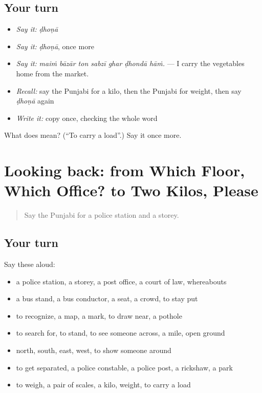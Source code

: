 \subsection*{Your turn}
\begin{itemize}
\raggedright
  \item \emph{Say it:} \emph{ḍhoṇā}
  \item \emph{Say it:} \emph{ḍhoṇā}, once more
  \item \emph{Say it:} \emph{maiṁ bāzār ton sabzī ghar ḍhondā hāṁ.} — I carry the vegetables home from the market.
  \item \emph{Recall:} say the Punjabi for a kilo, then the Punjabi for weight, then say \emph{ḍhoṇā} again
  \item \emph{Write it:} copy \textbf{} once, checking the whole word
\end{itemize}

\begin{tcolorbox}[breakable,colback=teal!4,colframe=teal!35!black,title={Before you move on}]
What does  mean? (\textquotedblleft{}To carry a load\textquotedblright{}.) Say it once more.
\end{tcolorbox}
\section[(dialogue)]{Looking back: from Which Floor, Which Office? to Two Kilos, Please}

\label{lesson:PA-R273-review-267-273}



\begin{quote}
Say the Punjabi for a police station and a storey.
\end{quote}

\subsection*{Your turn}
Say these aloud:

\begin{itemize}
\raggedright
  \item a police station, a storey, a post office, a court of law, whereabouts
  \item a bus stand, a bus conductor, a seat, a crowd, to stay put
  \item to recognize, a map, a mark, to draw near, a pothole
  \item to search for, to stand, to see someone across, a mile, open ground
  \item north, south, east, west, to show someone around
  \item to get separated, a police constable, a police post, a rickshaw, a park
  \item to weigh, a pair of scales, a kilo, weight, to carry a load
\end{itemize}

